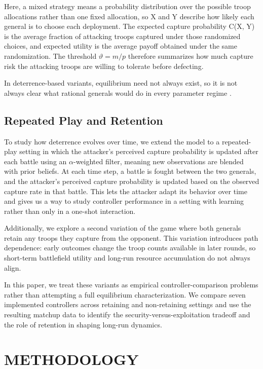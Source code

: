 \documentclass[letterpaper, 10 pt, conference]{ieeeconf}  %
\begin{document}
Here, a mixed strategy means a probability distribution over the possible troop allocations rather than one fixed allocation, so X and Y describe how likely each general is to choose each deployment. The expected capture probability C(X, Y) is the average fraction of attacking troops captured under those randomized choices, and expected utility is the average payoff obtained under the same randomization. The threshold $\vartheta = m/p$ therefore summarizes how much capture risk the attacking troops are willing to tolerate before defecting.

In deterrence-based variants, equilibrium need not always exist, so it is not always clear what rational generals would do in every parameter regime \cite{info_structure_deterrence}.

\subsection{Repeated Play and Retention}

To study how deterrence evolves over time, we extend the model to a repeated-play setting in which the attacker's perceived capture probability is updated after each battle using an $\alpha$-weighted filter, meaning new observations are blended with prior beliefs. At each time step, a battle is fought between the two generals, and the attacker's perceived capture probability is updated based on the observed capture rate in that battle. This lets the attacker adapt its behavior over time and gives us a way to study controller performance in a setting with learning rather than only in a one-shot interaction.

Additionally, we explore a second variation of the game where both generals retain any troops they capture from the opponent. This variation introduces path dependence: early outcomes change the troop counts available in later rounds, so short-term battlefield utility and long-run resource accumulation do not always align.

In this paper, we treat these variants as empirical controller-comparison problems rather than attempting a full equilibrium characterization. We compare seven implemented controllers across retaining and non-retaining settings and use the resulting matchup data to identify the security-versus-exploitation tradeoff and the role of retention in shaping long-run dynamics.

\section{METHODOLOGY}
\end{document}
